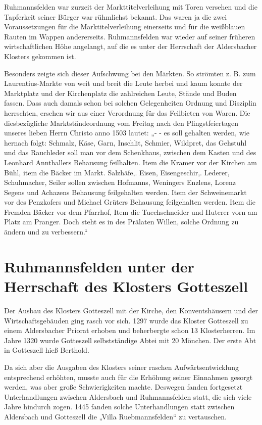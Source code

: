 \documentclass[12pt,a4paper]{book}
\begin{document}
Ruhmannsfelden war zurzeit der Markttitelverleihung mit Toren versehen und die
Tapferkeit seiner Bürger war rühmlichst bekannt. Das waren ja die zwei
Voraussetzungen für die Marktitelverleihung einerseits und für die weißblauen
Rauten im Wappen andererseits. Ruhmannsfelden war wieder auf seiner früheren
wirtschaftlichen Höhe angelangt, auf die es unter der Herrschaft der
Aldersbacher Klosters gekommen ist.

Besonders zeigte sich dieser Aufschwung bei den Märkten. So strömten z. B. zum
Laurentius-Markte von weit und breit die Leute herbei und kaum konnte der
Marktplatz und der Kirchenplatz die zahlreichen Leute, Stände und Buden fassen.
Dass auch damals schon bei solchen Gelegenheiten Ordnung und Disziplin
herrschten, ersehen wir aus einer Verordnung für das Feilbieten von Waren. Die
diesbezügliche Marktständeordnung vom Freitag nach den Pfingstfeiertagen unseres
lieben Herrn Christo anno 1503 lautet: „- - es soll gehalten werden, wie hernach
folgt: Schmalz, Käse, Garn, Inschlit, Schmier, Wildpret, das Gehstuhl und das
Rauchleder soll man vor dem Schenkhaus, zwischen dem Kasten und des Leonhard
Annthallers Behausung feilhalten. Item die Kramer vor der Kirchen am Bühl, item
die Bäcker im Markt. Salzhäfe,. Eisen, Eisengeschir,. Lederer, Schuhmacher,
Seiler sollen zwischen Hofmanns, Weningers Enzlens, Lorenz Segens und Achazens
Behausung feilgehalten werden. Item der Schweinemarkt vor des Penzkofers und
Michael Grüters Behausung feilgehalten werden. Item die Fremden Bäcker vor dem
Pfarrhof, Item die Tuechschneider und Huterer vorn am Platz am Pranger. Doch
steht es in des Prälaten Willen, solche Ordnung zu ändern und zu verbessern.“

\section{Ruhmannsfelden unter der Herrschaft des Klosters Gotteszell}

Der Ausbau des Klosters Gotteszell mit der Kirche, den Konventshäusern und der
Wirtschaftsgebäuden ging rasch vor sich. 1297 wurde das Kloster Gotteszell zu
einem Aldersbacher Priorat erhoben und beherbergte schon 13 Klosterherren. Im
Jahre 1320 wurde Gotteszell selbstständige Abtei mit 20 Mönchen. Der erste Abt
in Gotteszell hieß Berthold.

Da sich aber die Ausgaben des Klosters seiner raschen Aufwärtsentwicklung
entsprechend erhöhten, musste auch für die Erhöhung seiner Einnahmen gesorgt
werden, was aber große Schwierigkeiten machte. Deswegen fanden fortgesetzt
Unterhandlungen zwischen Aldersbach und Ruhmannsfelden statt, die sich viele
Jahre hindurch zogen. 1445 fanden solche Unterhandlungen statt zwischen
Aldersbach und Gotteszell die „Villa Ruebmannsfelden“ zu vertauschen.
\end{document}
